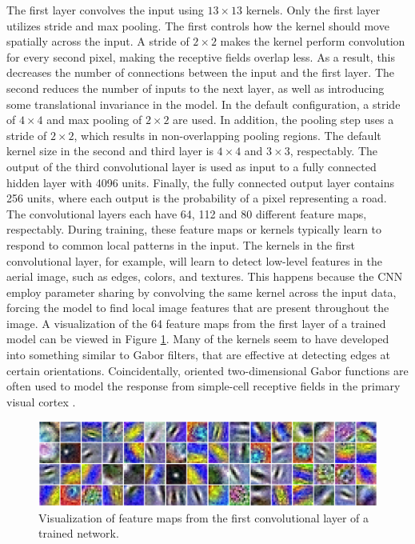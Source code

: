 The first layer convolves the input using $13 \times 13$ kernels. Only the first layer utilizes stride and max pooling. The first controls how the kernel should move spatially across the input. A stride of $2 \times 2$ makes the kernel perform convolution for every second pixel, making the receptive fields overlap less. As a result, this decreases the number of connections between the input and the first layer. The second reduces the number of inputs to the next layer, as well as introducing some translational invariance in the model. In the default configuration, a stride of $4 \times 4$ and max pooling of $2 \times 2$ are used. In addition, the pooling step uses a stride of $2 \times 2$, which results in non-overlapping pooling regions. The default kernel size in the second and third layer is $4 \times 4$ and $3 \times 3$, respectably. The output of the third convolutional layer is used as input to a fully connected hidden layer with 4096 units. Finally, the fully connected output layer contains 256 units, where each output is the probability of a pixel representing a road.\\


The convolutional layers each have 64, 112 and 80 different feature maps, respectably. During training, these feature maps or kernels typically learn to respond to common local patterns in the input. The kernels in the first convolutional layer, for example, will learn to detect low-level features in the aerial image, such as edges, colors, and textures. This happens because the \ac{CNN} employ parameter sharing by convolving the same kernel across the input data, forcing the model to find local image features that are present throughout the image. A visualization of the 64 feature maps from the first layer of a trained model can be viewed in Figure \ref{fig:convoluional_first_layer_visualization}. Many of the kernels seem to have developed into something similar to Gabor filters, that are effective at detecting edges at certain orientations. Coincidentally, oriented two-dimensional Gabor functions are often used to model the response from simple-cell receptive fields in the primary visual cortex \citep{Ringach_gabor_spatial}. \\


\begin{figure}
\begin{center}
\includegraphics[width=1\columnwidth]{figs/network/Filter_unblurred.png}
\caption[Visualization of filter map]{Visualization of feature maps from the first convolutional layer of a trained network.}
\label{fig:convoluional_first_layer_visualization}
\end{center}
\end{figure}

